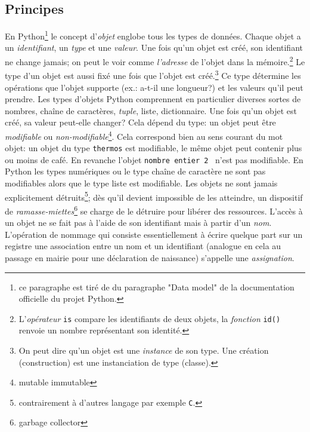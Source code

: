\subsection{Principes}
En Python\footnote{ce paragraphe est tiré de du paragraphe "Data model" de la documentation officielle du projet Python.} le concept d'\emph{objet} englobe tous les types de données. 
Chaque objet a un \emph{identifiant}, un \emph{type} et une \emph{valeur}.\newline
Une fois qu'un objet est créé, son identifiant ne change jamais; on peut le voir comme \emph{l'adresse} de l'objet dans la mémoire.\footnote{L'\emph{opérateur} \texttt{is} compare les identifiants de deux objets, la \emph{fonction} \texttt{id()} renvoie un nombre représentant son identité.}\newline
Le type d'un objet est aussi fixé une fois que l'objet est créé.\footnote{On peut dire qu'un objet est une \emph{instance} de son type. Une création (construction) est une instanciation de type (classe).} Ce type détermine les opérations que l'objet supporte (ex.: a-t-il une longueur?) et les valeurs qu'il peut prendre. Les types d'objets Python comprennent en particulier diverses sortes de nombres, chaîne de caractères, \emph{tuple}, liste, dictionnaire.\newline
Une fois qu'un objet est créé, sa valeur peut-elle changer? Cela dépend du type: un objet peut être \emph{modifiable}   ou \emph{non-modifiable}\footnote{mutable immutable}. Cela correspond bien au sens courant du mot objet: un objet du type \texttt{thermos} est modifiable, le même objet peut contenir plus ou moins de café. En revanche l'objet \texttt{nombre entier 2} ~n'est pas modifiable. En Python les types numériques ou le type chaîne de caractère ne sont pas modifiables alors que le type liste est modifiable.\newline
Les objets ne sont jamais explicitement détruits\footnote{contrairement à d'autres langage par exemple \texttt{C}.}; dès qu'il devient impossible de les atteindre, un dispositif de \emph{ramasse-miettes}\footnote{garbage collector} se charge de le détruire pour libérer des ressources.\newline
L'accès à un objet ne se fait pas à l'aide de son identifiant mais à partir d'un \emph{nom}.   L'opération de nommage qui consiste essentiellement à écrire quelque part sur un registre une association entre un nom et un identifiant (analogue en cela au passage en mairie pour une déclaration de naissance) s'appelle une \emph{assignation}.\newline 
